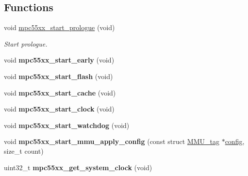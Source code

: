 \subsection*{Functions}
\begin{DoxyCompactItemize}
\item 
void \mbox{\hyperlink{mpc55xx-config_8h_a7e6c6f6f004eadf1f5e8606cab9ec22e}{mpc55xx\+\_\+start\+\_\+prologue}} (void)
\begin{DoxyCompactList}\small\item\em Start prologue. \end{DoxyCompactList}\item 
\mbox{\label{mpc55xx-config_8h_a86b148a515255ebda04ca9cc338994eb}} 
void {\bfseries mpc55xx\+\_\+start\+\_\+early} (void)
\item 
\mbox{\label{mpc55xx-config_8h_a3cb3cd3747fa72fe792c9096c1787e41}} 
void {\bfseries mpc55xx\+\_\+start\+\_\+flash} (void)
\item 
\mbox{\label{mpc55xx-config_8h_a1818f32c9271407fa0a23502868ebb92}} 
void {\bfseries mpc55xx\+\_\+start\+\_\+cache} (void)
\item 
\mbox{\label{mpc55xx-config_8h_ada39c43104a55802313770180e5d1f20}} 
void {\bfseries mpc55xx\+\_\+start\+\_\+clock} (void)
\item 
\mbox{\label{mpc55xx-config_8h_abf751ca54bda2c0ad81c7ca58cd32155}} 
void {\bfseries mpc55xx\+\_\+start\+\_\+watchdog} (void)
\item 
\mbox{\label{mpc55xx-config_8h_a8a5ca4d1e833a0a0c79c9d82c863dac4}} 
void {\bfseries mpc55xx\+\_\+start\+\_\+mmu\+\_\+apply\+\_\+config} (const struct \mbox{\hyperlink{structMMU__tag}{M\+M\+U\+\_\+tag}} $\ast$\mbox{\hyperlink{structconfig__s}{config}}, size\+\_\+t count)
\item 
\mbox{\label{mpc55xx-config_8h_adafd9c30091cdf0d45ddc859bb1d2822}} 
uint32\+\_\+t {\bfseries mpc55xx\+\_\+get\+\_\+system\+\_\+clock} (void)
\end{DoxyCompactItemize}
